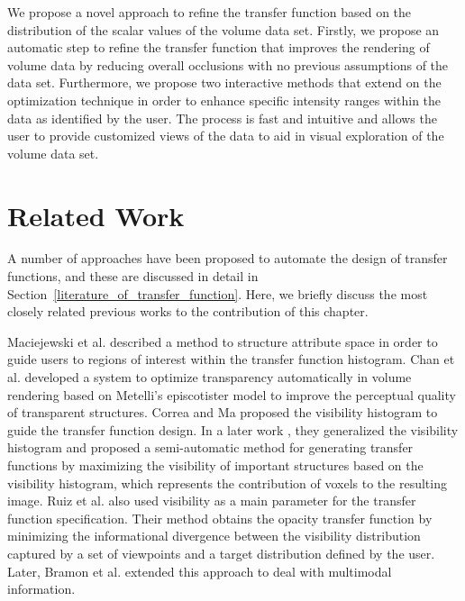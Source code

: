 We propose a novel approach to refine the transfer function based on the distribution of the scalar values of the volume data set.
Firstly, we propose an automatic step to refine the transfer function that improves the rendering of volume data by reducing overall occlusions with no previous assumptions of the data set. Furthermore, we propose two interactive methods that extend on the optimization technique in order to enhance specific intensity ranges within the data as identified by the user. The process is fast and intuitive and allows the user to provide customized views of the data to aid in visual exploration of the volume data set.

\section{Related Work}
A number of approaches have been proposed to automate the design of transfer functions,
and these are discussed in detail in Section~\ref{literature_of_transfer_function}. Here, we briefly discuss the most closely related previous works to the contribution of this chapter.

Maciejewski et al. \cite{maciejewski_structuring_2009} described a method to structure attribute space in order to guide users to regions of interest within the transfer function histogram.
Chan et al. \cite{chan_perception-based_2009} developed a system to optimize transparency automatically in volume rendering based on Metelli's episcotister model to improve the perceptual quality of transparent structures.
Correa and Ma \cite{correa_visibility-driven_2009} proposed the visibility histogram to guide the transfer function design. In a later work \cite{correa_visibility_2011}, they generalized the visibility histogram and proposed a semi-automatic method for generating transfer functions by maximizing the visibility of important structures based on the visibility histogram, which represents the contribution of voxels to the resulting image.
Ruiz et al. \cite{ruiz_automatic_2011} also used visibility as a main parameter for the transfer function specification. Their method obtains the opacity transfer function by minimizing the informational divergence between the visibility distribution captured by a set of viewpoints and a target distribution defined by the user. Later, Bramon et al. \cite{bramon_information_2013} extended this approach to deal with multimodal information.

